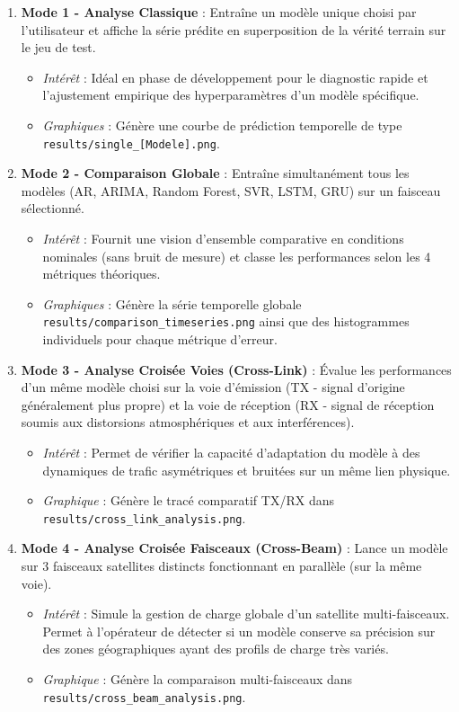 \documentclass[11pt,a4paper]{article}
\begin{document}
\begin{enumerate}
    \item \textbf{Mode 1 - Analyse Classique} : Entraîne un modèle unique choisi par l'utilisateur et affiche la série prédite en superposition de la vérité terrain sur le jeu de test.
    \begin{itemize}
        \item \textit{Intérêt} : Idéal en phase de développement pour le diagnostic rapide et l'ajustement empirique des hyperparamètres d'un modèle spécifique.
        \item \textit{Graphiques} : Génère une courbe de prédiction temporelle de type \texttt{results/single\_[Modele].png}.
    \end{itemize}
    
    \item \textbf{Mode 2 - Comparaison Globale} : Entraîne simultanément tous les modèles (AR, ARIMA, Random Forest, SVR, LSTM, GRU) sur un faisceau sélectionné.
    \begin{itemize}
        \item \textit{Intérêt} : Fournit une vision d'ensemble comparative en conditions nominales (sans bruit de mesure) et classe les performances selon les 4 métriques théoriques.
        \item \textit{Graphiques} : Génère la série temporelle globale \texttt{results/comparison\_timeseries.png} ainsi que des histogrammes individuels pour chaque métrique d'erreur.
    \end{itemize}
    
    \item \textbf{Mode 3 - Analyse Croisée Voies (Cross-Link)} : Évalue les performances d'un même modèle choisi sur la voie d'émission (TX - signal d'origine généralement plus propre) et la voie de réception (RX - signal de réception soumis aux distorsions atmosphériques et aux interférences).
    \begin{itemize}
        \item \textit{Intérêt} : Permet de vérifier la capacité d'adaptation du modèle à des dynamiques de trafic asymétriques et bruitées sur un même lien physique.
        \item \textit{Graphique} : Génère le tracé comparatif TX/RX dans \texttt{results/cross\_link\_analysis.png}.
    \end{itemize}
    
    \item \textbf{Mode 4 - Analyse Croisée Faisceaux (Cross-Beam)} : Lance un modèle sur 3 faisceaux satellites distincts fonctionnant en parallèle (sur la même voie).
    \begin{itemize}
        \item \textit{Intérêt} : Simule la gestion de charge globale d'un satellite multi-faisceaux. Permet à l'opérateur de détecter si un modèle conserve sa précision sur des zones géographiques ayant des profils de charge très variés.
        \item \textit{Graphique} : Génère la comparaison multi-faisceaux dans \texttt{results/cross\_beam\_analysis.png}.
    \end{itemize}
    

\end{enumerate}
\end{document}

